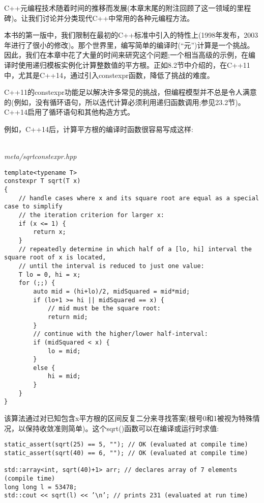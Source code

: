 
C++元编程技术随着时间的推移而发展(本章末尾的附注回顾了这一领域的里程碑)。让我们讨论并分类现代C++中常用的各种元编程方法。


本书的第一版中，我们限制在最初的C++标准中引入的特性上(1998年发布，2003年进行了很小的修改)。那个世界里，编写简单的编译时(“元”)计算是一个挑战。因此，我们在本章中花了大量的时间来研究这个问题;一个相当高级的示例，在编译时使用递归模板实例化计算整数值的平方根。正如8.2节中介绍的，在C++11中，尤其是C++14，通过引入constexpr函数，降低了挑战的难度。

\begin{tcolorbox}[colback=webgreen!5!white,colframe=webgreen!75!black]
\hspace*{0.75cm}C++11的constexpr功能足以解决许多常见的挑战，但编程模型并不总是令人满意的(例如，没有循环语句，所以迭代计算必须利用递归函数调用;参见23.2节)。C++14启用了循环语句和其他构造方式。
\end{tcolorbox}

例如，C++14后，计算平方根的编译时函数很容易写成这样:

\hspace*{\fill} \\ %
\noindent
\textit{meta/sqrtconstexpr.hpp}
\begin{lstlisting}[style=styleCXX]
template<typename T>
constexpr T sqrt(T x)
{
	// handle cases where x and its square root are equal as a special case to simplify
	// the iteration criterion for larger x:
	if (x <= 1) {
		return x;
	}
	// repeatedly determine in which half of a [lo, hi] interval the square root of x is located,
	// until the interval is reduced to just one value:
	T lo = 0, hi = x;
	for (;;) {
		auto mid = (hi+lo)/2, midSquared = mid*mid;
		if (lo+1 >= hi || midSquared == x) {
			// mid must be the square root:
			return mid;
		}
		// continue with the higher/lower half-interval:
		if (midSquared < x) {
			lo = mid;
		}
		else {
			hi = mid;
		}
	}
}
\end{lstlisting}

该算法通过对已知包含x平方根的区间反复二分来寻找答案(根号0和1被视为特殊情况，以保持收敛准则简单)。这个sqrt()函数可以在编译或运行时求值:

\begin{lstlisting}[style=styleCXX]
static_assert(sqrt(25) == 5, ""); // OK (evaluated at compile time)
static_assert(sqrt(40) == 6, ""); // OK (evaluated at compile time)

std::array<int, sqrt(40)+1> arr; // declares array of 7 elements (compile time)
long long l = 53478;
std::cout << sqrt(l) << ’\n’; // prints 231 (evaluated at run time)
\end{lstlisting}

